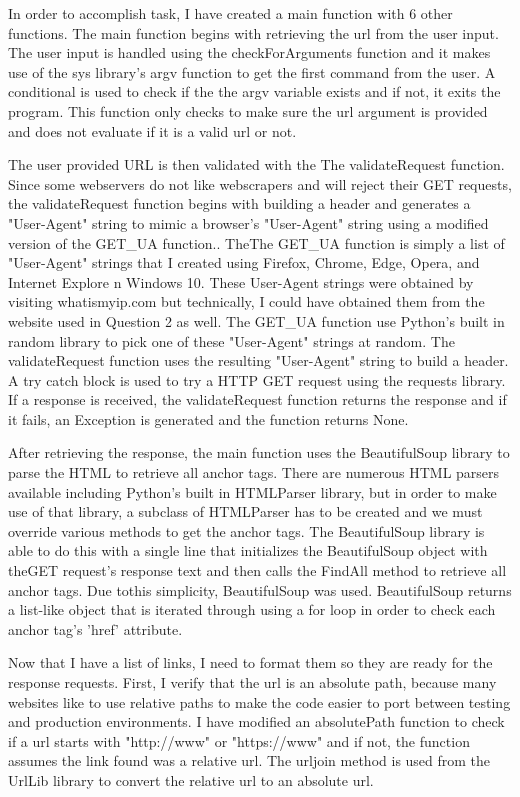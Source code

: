 \documentclass[12pt]{article}
\begin{document}
In order to accomplish task, I have created a main function with 6 other functions. The main function begins with retrieving the url  from the user input. The user input is handled using the checkForArguments function and it makes use of the sys library's argv function to get the first command from the user. A conditional is used to check if the the argv variable exists and if not, it exits the program. This function only checks to make sure the url argument is provided and does not evaluate if it is a valid url or not.

The user provided URL is then validated with the The validateRequest function. Since some webservers do not like webscrapers and will reject their GET requests, the validateRequest function begins with building a header and generates a "User-Agent" string to mimic a browser's "User-Agent" string using a modified version of the GET\_UA function.\cite{randomizeUserAgent}. TheThe GET\_UA function is simply a list of "User-Agent" strings that I created using Firefox, Chrome, Edge, Opera, and Internet Explore n Windows 10. These User-Agent strings were obtained by visiting whatismyip.com \cite{whatIsMyIp} but technically, I could have obtained them from the website used in Question 2 as well. The GET\_UA  function use Python's built in random library to pick one of these "User-Agent" strings at random. The validateRequest function uses the resulting "User-Agent" string to build a header. A try catch block is used to try a HTTP GET request using the requests library. If a response is received, the validateRequest function returns the response and if it fails, an Exception is generated and the function returns None. 

After retrieving the response, the main function uses the BeautifulSoup library to parse the HTML to retrieve all anchor tags. There are numerous HTML parsers available including Python's built in HTMLParser library, but in order to make use of that library, a subclass of HTMLParser has to be created and we must override various methods to get the anchor tags. The BeautifulSoup library is able to do this with a single line that initializes the BeautifulSoup object with theGET request's response text and then calls the FindAll method to retrieve all anchor tags. Due tothis simplicity, BeautifulSoup was used.  BeautifulSoup returns a list-like object that is iterated through using a for loop in order to check each anchor tag's 'href' attribute. 

Now that I have a list of links, I need to format them so they are ready for the response requests. First, I verify that the url is an absolute path, because many websites like to use relative paths to make the code easier to port between testing and production environments. I have modified an absolutePath function \cite{stackOverflowRelativePath} to check if a url starts with "http://www" or "https://www" and if not, the function assumes the link found was a relative url. The urljoin method is used from the UrlLib library to convert the relative url to an absolute url.
\end{document}
